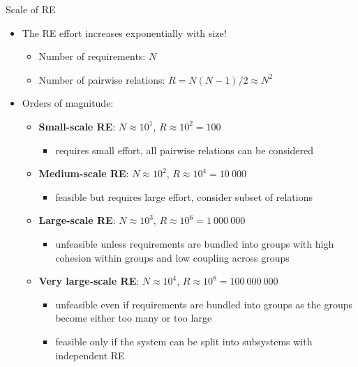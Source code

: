 \begin{Slide}{Scale of RE}
\begin{itemize}
\item The RE effort increases exponentially with size! 
\begin{itemize}
\item Number of requirements: $N$
\item Number of pairwise relations: $R = N(N -1)/2 \approx N^2$
\end{itemize}
\item Orders of magnitude:
\begin{itemize}
\item \textbf{Small-scale RE}: \hfill $N \approx 10^1$, $R \approx 10^2 = 100$
\begin{itemize}
\item requires small effort, all pairwise relations can be considered 
\end{itemize}
\item \textbf{Medium-scale RE}: \hfill $N \approx 10^2$, $R \approx 10^4 = 10~000$ 
\begin{itemize}
\item feasible but requires large effort, consider subset of relations
\end{itemize}
\item \textbf{Large-scale RE}: \hfill $N \approx 10^3$, $R \approx 10^6 = 1~000~000$
\begin{itemize}
\item  unfeasible unless requirements are bundled into groups with high cohesion within groups and low coupling across groups
\end{itemize}
\item \textbf{Very large-scale RE}: \hfill $N \approx 10^4$, $R \approx 10^8 = 100~000~000$
\begin{itemize}
\item unfeasible even if requirements are bundled into groups as the groups become either too many or too large
\item feasible only if the system can be split into subsystems with independent RE 




\end{itemize}
\end{itemize}
\end{itemize}
\end{Slide}